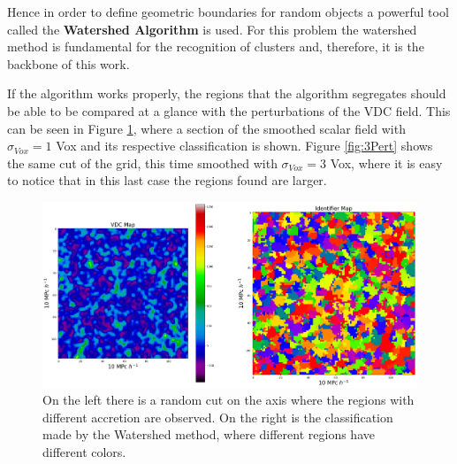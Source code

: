  Hence in order to define geometric boundaries for random objects a powerful tool called  the \textbf{Watershed Algorithm} is used. For this problem the watershed method is fundamental for the recognition of clusters and, therefore, it is the backbone of this work.




If the algorithm works properly, the regions that the algorithm segregates should be able to be compared at a glance with the perturbations of the VDC field. This can be seen in Figure \ref{fig:1Pert}, where a section of the smoothed scalar field with $\sigma_{Vox} = 1$ Vox and its respective classification is shown. Figure \ref{fig:3Pert} shows the same cut of the grid, this time smoothed with $\sigma_{Vox} = 3$ Vox, where it is easy to notice that in this last case the regions found are larger.

\begin{figure}
    \centering
    \includegraphics[width=380pt]{1PlotPert_48.png}
    \caption{On the left there is a random cut on the axis where the regions with different accretion are observed. On the right is the classification made by the Watershed method, where different regions have different colors.}
    \label{fig:1Pert}
\end{figure}


